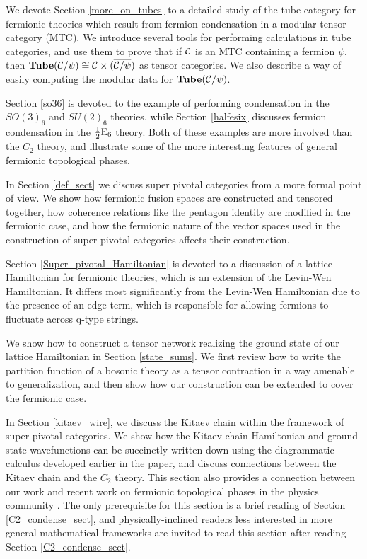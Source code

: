 We devote Section \ref{more_on_tubes} to a detailed study of the tube category 
for fermionic theories which result from fermion condensation in a modular tensor category (MTC). 
We introduce several tools for performing calculations in tube categories, 
and use them to prove that if $\mathcal{C}$ is an MTC containing a fermion $\psi$, then
$\textbf{Tube}(\mathcal{C}/\psi)\cong \mathcal{C}\times (\overline{\mathcal{C}/\psi})$ as tensor 
categories. We also describe a way of easily computing the modular data for 
$\textbf{Tube}(\mathcal{C}/\psi)$. 

Section \ref{so36} is devoted to the example of performing condensation in the $SO(3)_6$ 
and $SU(2)_6$ theories, while Section \ref{halfesix} discusses fermion condensation in the $
\frac{1}{2}\text{E}_6$ theory. 
Both of these examples are more involved than the $C_2$ theory, 
and illustrate some of the more interesting features of general fermionic topological phases. 

In Section \ref{def_sect} we discuss super pivotal categories from a more formal point of view. 
We show how fermionic fusion spaces are constructed and tensored together, how 
coherence relations like the pentagon identity are modified in the fermionic case, 
and how the fermionic nature of the vector spaces used in the construction of super 
pivotal categories affects their construction. 

Section \ref{Super_pivotal_Hamiltonian} is devoted to a discussion of a lattice Hamiltonian for fermionic theories, which is an extension of the Levin-Wen Hamiltonian. 
It differs most significantly from the Levin-Wen Hamiltonian due to the presence of an edge term, which 
is responsible for allowing fermions to fluctuate across q-type strings.

We show how to construct a tensor network realizing the ground state of our lattice Hamiltonian 
in Section \ref{state_sums}. We first review how to write the partition function of a bosonic theory 
as a tensor contraction in a way amenable to generalization, and then show how our construction 
can be extended to cover the fermionic case. 

In Section \ref{kitaev_wire}, we discuss the Kitaev chain within the framework of super pivotal 
categories. 
We show how the Kitaev chain Hamiltonian and ground-state wavefunctions can be 
succinctly written down using the diagrammatic calculus developed earlier in the paper, and 
discuss connections between the Kitaev chain and the $C_2$ theory. 
This section also provides a connection between our work 
and recent work on fermionic topological phases in the physics community \cite{ware2016,tarantino2016,turzillo2016}. 
The only prerequisite for this section is a brief reading of Section \ref{C2_condense_sect}, and physically-inclined readers less interested in more general mathematical frameworks
are invited to read this section after reading Section \ref{C2_condense_sect}. 

